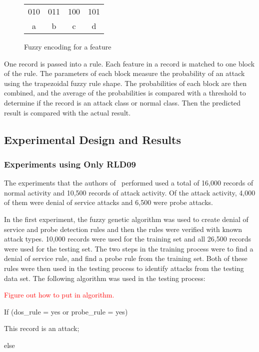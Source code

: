 \documentclass{sig-alternate}
\newcommand{\mycomment}[1]{\textcolor{red}{#1}}
\begin{document}
\begin{figure}
\centering
\caption{Fuzzy encoding for a feature}
\begin{tabular}{|c|c|c|c|} \hline
010 & 011 & 100 & 101\\
a & b & c & d\\
\hline\end{tabular}
\label{fig:fuzEncodingForFeature}
\end{figure}

One record is passed into a rule. Each feature in a record is matched to one block of the rule. The parameters of each block measure the probability of an attack using the trapezoidal fuzzy rule shape. The probabilities of each block are then combined, and the average of the probabilities is compared with a threshold to determine if the record is an attack class or normal class. Then the predicted result is compared with the actual result.




\subsection{Experimental Design and Results}
\subsubsection{Experiments using Only RLD09}
The experiments that the authors of~\cite{6496342, 6559603} performed used a total of 16,000 records of normal activity and 10,500 records of attack activity. Of the attack activity, 4,000 of them were denial of service attacks and 6,500 were probe attacks.

In the first experiment, the fuzzy genetic algorithm was used to create denial of service and probe detection rules and then the rules were verified with known attack types. 10,000 records were used for the training set and all 26,500 records were used for the testing set. The two steps in the training process were to find a denial of service rule, and find a probe rule from the training set. Both of these rules were then used in the testing process to identify attacks from the testing data set. The following algorithm was used in the testing process:

\mycomment{Figure out how to put in algorithm.}

If (dos\_rule = yes or probe\_rule = yes)

   This record is an attack;

else
\end{document}
